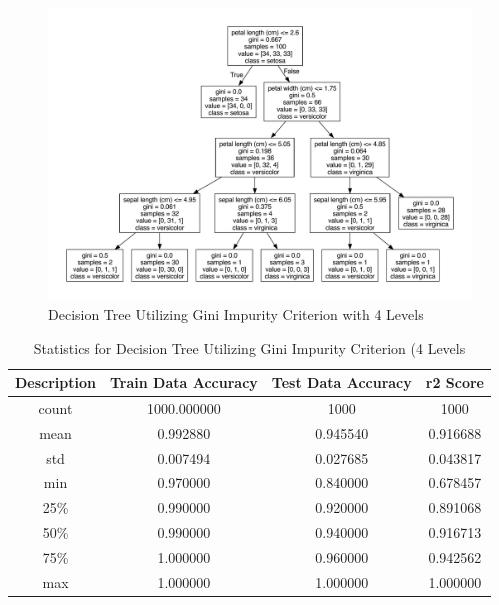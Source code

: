\documentclass[journal]{IEEEtran}
\begin{document}
\begin{figure}[h!]
\includegraphics[scale=0.25]{iris-gini-4levels.pdf}
\centering
\caption{Decision Tree Utilizing Gini Impurity Criterion with 4 Levels}
\label{fig:dtGI4}
\end{figure}

\newpage


\begin{table}[h!]
\centering
\begin{tabular}{ c | c c c }
    Description & Train Data Accuracy & Test Data Accuracy & r2 Score \\ 
\hline
count     &     1000.000000     &    1000 & 1000\\
mean      &        0.992880     &       0.945540  &   0.916688\\
std       &        0.007494     &       0.027685  &   0.043817\\
min       &        0.970000     &       0.840000  &   0.678457\\
25\%      &         0.990000    &        0.920000 &    0.891068\\
50\%      &         0.990000    &        0.940000 &    0.916713\\
75\%      &         1.000000    &        0.960000 &    0.942562\\
max       &        1.000000     &       1.000000  &   1.000000
\end{tabular}
\caption{Statistics for Decision Tree Utilizing Gini Impurity Criterion (4 Levels}
\label{table:dtGI4}
\end{table}
\end{document}
